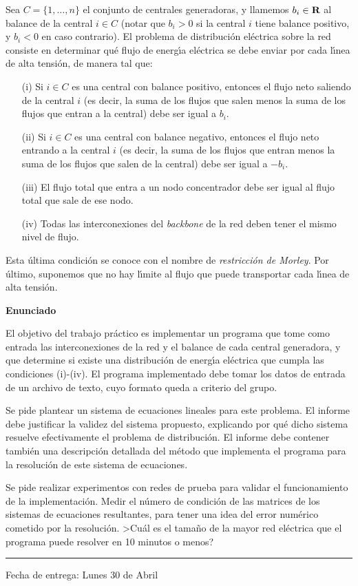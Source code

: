 Sea $C=\{1,\dots,n\}$ el conjunto de centrales generadoras, y llamemos
$b_i\in\hbox{\bf R}$ al balance de la central $i\in C$ (notar que $b_i>0$ si la
central $i$ tiene balance positivo, y $b_i<0$ en caso contrario). El problema
de distribuci\'on el\'ectrica sobre la red consiste en determinar
qu\'e flujo de energ\'\i a el\'ectrica se debe enviar por cada l\'\i nea
de alta tensi\'on, de manera tal que:
\begin{itemize}
\item[(i)] Si $i\in C$ es una central con balance positivo, entonces el flujo
neto saliendo de la central $i$ (es decir, la suma de los flujos que salen
menos la suma de los flujos que entran a la central) debe ser igual a $b_i$.
\item[(ii)] Si $i\in C$ es una central con balance negativo, entonces el
flujo neto entrando a la central $i$ (es decir, la suma de los flujos que
entran menos la suma de los flujos que salen de la central) debe ser igual
a $-b_i$.
\item[(iii)] El flujo total que entra a un nodo concentrador debe ser igual
al flujo total que sale de ese nodo.
\item[(iv)] Todas las interconexiones del \emph{backbone} de la red deben
tener el mismo nivel de flujo.
\end{itemize}
Esta \'ultima condici\'on se conoce con el nombre de \emph{restricci\'on
de Morley}. Por \'ultimo, su\-po\-ne\-mos que no hay l\'\i mite al flujo que
puede transportar cada l\'\i nea de alta tensi\'on.

\textbf{Enunciado}

El objetivo del trabajo pr\'actico es implementar un programa que tome como
entrada las interconexiones de la red y el balance de cada central
generadora, y que determine si existe una distribuci\'on de energ\'\i a
el\'ectrica que cumpla las condiciones (i)-(iv). El programa implementado
debe tomar los datos de entrada de un archivo de texto, cuyo formato queda
a criterio del grupo.

Se pide plantear un sistema de ecuaciones lineales para este problema.
El informe debe justificar la validez del sistema propuesto, explicando por
qu\'e dicho sistema resuelve efectivamente el problema de distribuci\'on.
El informe debe contener tambi\'en una descripci\'on detallada del m\'etodo
que implementa el programa para la resoluci\'on de este sistema de ecuaciones.

Se pide realizar experimentos con redes de prueba para validar el
funcionamiento de la implementaci\'on. Medir el n\'umero de condici\'on de
las matrices de los sistemas de ecuaciones resultantes, para tener una idea
del error num\'erico cometido por la resoluci\'on. >Cu\'al es el tama\~no
de la mayor red el\'ectrica que el programa puede resolver en 10 minutos
o menos?

\vskip 15pt

\hrule

\vskip 11pt

Fecha de entrega: Lunes 30 de Abril

%
